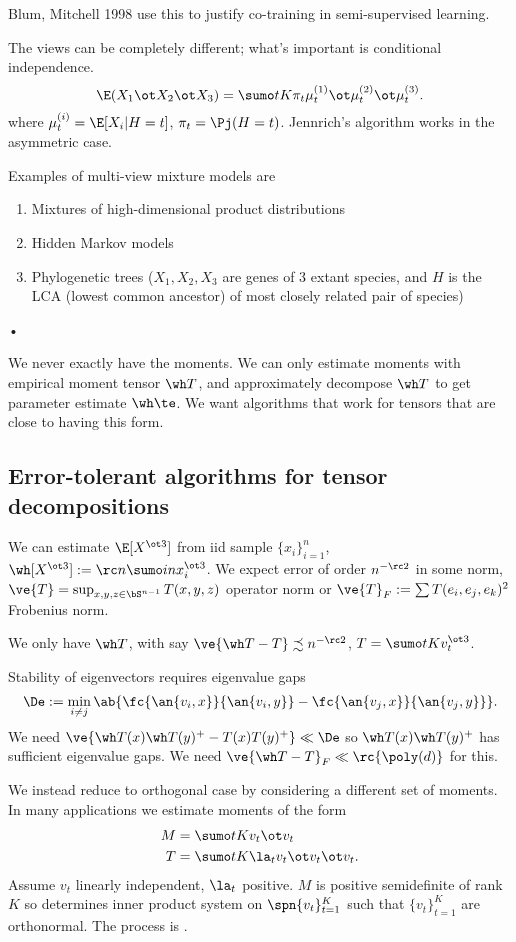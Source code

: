 Blum, Mitchell 1998 use this to justify co-training in semi-supervised learning. 

The views can be completely different; what's important is conditional independence.
$$
\E(X_1\ot X_2\ot X_3) = \sumo tK \pi_t \mu_t^{(1)}\ot \mu_t^{(2)} \ot \mu_t^{(3)}. 
$$
where $\mu_t^{(i)} = \E[X_i |H=t]$, $\pi_t=\Pj(H=t)$. Jennrich's algorithm works in the asymmetric case.

Examples of multi-view mixture models are
\begin{enumerate}
\item
Mixtures of high-dimensional product distributions
\item
Hidden Markov models
\item
Phylogenetic trees ($X_1,X_2,X_3$ are genes of 3 extant species, and $H$ is the LCA (lowest common ancestor) of most closely related pair of species)
\end{enumerate}•


We never exactly have the moments. We can only estimate moments with empirical moment tensor $\wh T$, and approximately decompose $\wh T$ to get parameter estimate $\wh \te$. We want algorithms that work for tensors that are close to having this form.

\subsection{Error-tolerant algorithms for tensor decompositions}

We can estimate $\E [X^{\ot 3}]$ from iid sample $\{x_i\}_{i=1}^n$, $\wh [X^{\ot 3}]:=\rc n\sumo in x_i^{\ot 3}$. We expect error of order $n^{-\rc 2}$ in some norm, $\ve{T}=\sup_{x,y,z\in \bS^{n-1}}T(x,y,z)$ operator norm or $\ve{T}_{F}:=\sum T(e_i,e_j,e_k)^2$ Frobenius norm.

We only have $\wh T$, with say $\ve{\wh T-T}\precsim n^{-\rc 2}$, $T=\sumo tK v_t^{\ot 3}$. 

Stability of eigenvectors requires eigenvalue gaps
$$
\De :=\min_{i\ne j} \ab{\fc{\an{v_i,x}}{\an{v_i,y}} - \fc{\an{v_j,x}}{\an{v_j,y}}}.
$$
We need $\ve{\wh T(x)\wh T(y)^+ - T(x) T(y)^+} \ll \De$ so $\wh T(x) \wh T(y)^+$ has sufficient eigenvalue gaps. We need $\ve{\wh T-T}_F\ll \rc{\poly(d)}$ for this.

We instead reduce to orthogonal case by considering a different set of moments.
In many applications we estimate moments of the form 
\begin{align}
M&=\sumo tK v_t\ot v_t\\
T&=\sumo tK \la_t v_t\ot v_t\ot v_t.
\end{align}
Assume $v_t$ linearly independent, $\la_t$ positive.
$M$ is positive semidefinite of rank $K$ so determines inner product system on $\spn\{v_t\}_{t=1}^K$ such that $\{v_t\}_{t=1}^K$ are orthonormal. The process is .

